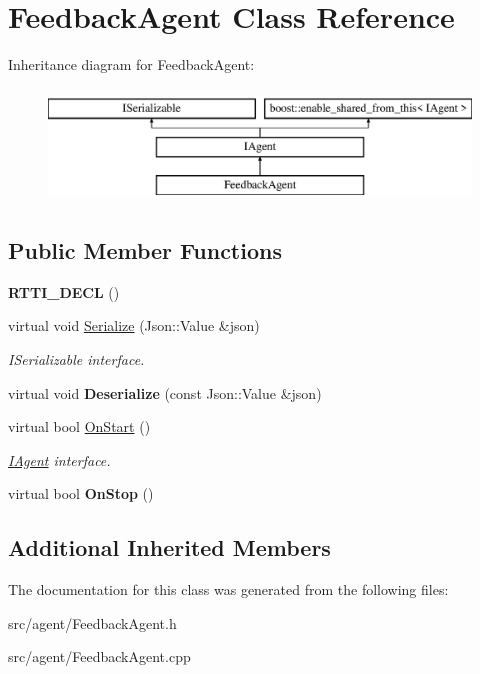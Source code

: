 \hypertarget{class_feedback_agent}{}\section{Feedback\+Agent Class Reference}
\label{class_feedback_agent}
Inheritance diagram for Feedback\+Agent\+:\begin{figure}[H]
\begin{center}
\leavevmode
\includegraphics[height=3.000000cm]{class_feedback_agent}
\end{center}
\end{figure}
\subsection*{Public Member Functions}
\begin{DoxyCompactItemize}
\item 
\mbox{\label{class_feedback_agent_a4b980f75d4844422e9115b712756d52f}} 
{\bfseries R\+T\+T\+I\+\_\+\+D\+E\+CL} ()
\item 
\mbox{\label{class_feedback_agent_a1c2ba04c669c5de53307745e1f73ddfa}} 
virtual void \hyperlink{class_feedback_agent_a1c2ba04c669c5de53307745e1f73ddfa}{Serialize} (Json\+::\+Value \&json)
\begin{DoxyCompactList}\small\item\em I\+Serializable interface. \end{DoxyCompactList}\item 
\mbox{\label{class_feedback_agent_a57332a70fb9818b9d0ae83a1d043c354}} 
virtual void {\bfseries Deserialize} (const Json\+::\+Value \&json)
\item 
\mbox{\label{class_feedback_agent_a76f85c5c893229b493b53a67fc4cf54f}} 
virtual bool \hyperlink{class_feedback_agent_a76f85c5c893229b493b53a67fc4cf54f}{On\+Start} ()
\begin{DoxyCompactList}\small\item\em \hyperlink{class_i_agent}{I\+Agent} interface. \end{DoxyCompactList}\item 
\mbox{\label{class_feedback_agent_ad9a3c839cb4b945f955cda57cb7659b2}} 
virtual bool {\bfseries On\+Stop} ()
\end{DoxyCompactItemize}
\subsection*{Additional Inherited Members}


The documentation for this class was generated from the following files\+:\begin{DoxyCompactItemize}
\item 
src/agent/Feedback\+Agent.\+h\item 
src/agent/Feedback\+Agent.\+cpp\end{DoxyCompactItemize}
